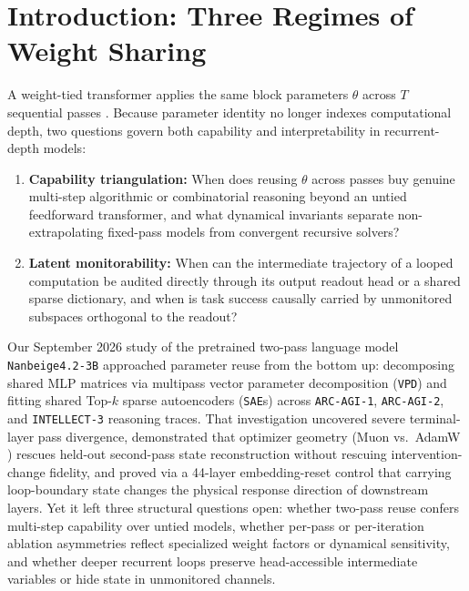 \documentclass[10pt,letterpaper]{article}
\begin{document}
\section{Introduction: Three Regimes of Weight Sharing}\label{sec:intro}

A weight-tied transformer applies the same block parameters $\theta$ across $T$ sequential passes \cite{dehghani2019universal,giannou2023looped,saunshi2025latent,geiping2025huginn,jolicoeur2025trm}. Because parameter identity no longer indexes computational depth, two questions govern both capability and interpretability in recurrent-depth models:
\begin{enumerate}[topsep=3pt,itemsep=2pt]
  \item \textbf{Capability triangulation:} When does reusing $\theta$ across passes buy genuine multi-step algorithmic or combinatorial reasoning beyond an untied feedforward transformer, and what dynamical invariants separate non-extrapolating fixed-pass models from convergent recursive solvers?
  \item \textbf{Latent monitorability:} When can the intermediate trajectory of a looped computation be audited directly through its output readout head or a shared sparse dictionary, and when is task success causally carried by unmonitored subspaces orthogonal to the readout?
\end{enumerate}

Our September 2026 study of the pretrained two-pass language model \texttt{Nanbeige4.2-3B} \cite{dugan2026vpd} approached parameter reuse from the bottom up: decomposing shared MLP matrices via multipass vector parameter decomposition (\texttt{VPD}) \cite{braun2025apd} and fitting shared Top-$k$ sparse autoencoders (\texttt{SAE}s) \cite{bricken2023monosemanticity,gao2024scaling} across \texttt{ARC-AGI-1}, \texttt{ARC-AGI-2}, and \texttt{INTELLECT-3} reasoning traces. That investigation uncovered severe terminal-layer pass divergence, demonstrated that optimizer geometry (Muon vs.\ AdamW \cite{jordan2024muon}) rescues held-out second-pass state reconstruction without rescuing intervention-change fidelity, and proved via a 44-layer embedding-reset control that carrying loop-boundary state changes the physical response direction of downstream layers. Yet it left three structural questions open: whether two-pass reuse confers multi-step capability over untied models, whether per-pass or per-iteration ablation asymmetries reflect specialized weight factors or dynamical sensitivity, and whether deeper recurrent loops preserve head-accessible intermediate variables or hide state in unmonitored channels.
\end{document}
